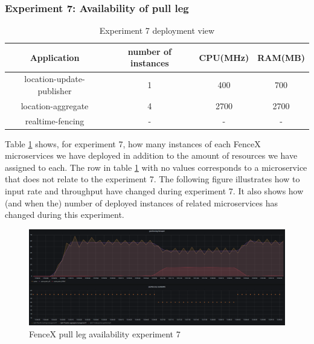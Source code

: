 \documentclass[a4]{report}
\begin{document}
    \subsubsection{Experiment 7: Availability of pull leg}
    \begin{table}[h!]
        \centering
        \begin{tabular}{|c|c|c|c|}
            \hline
            Application               & number of instances & CPU(MHz) & RAM(MB) \\
            \hline
            location-update-publisher & 1                   & 400      & 700     \\
            location-aggregate        & 4                   & 2700     & 2700    \\
            realtime-fencing          & -                   & -        & -       \\
            \hline
        \end{tabular}
        \caption{Experiment 7 deployment view}
        \label{table:ex7-dv}
    \end{table}

    Table \ref{table:ex7-dv} shows, for experiment 7, how many instances of each FenceX microservices we have
    deployed in addition to the amount of resources we have assigned to each.
    The row in table \ref{table:ex7-dv} with no values corresponds to a microservice that does not relate to the
    experiment 7.
    The following figure illustrates how to input rate and throughput have changed during experiment 7.
    It also shows how (and when the) number of deployed instances of related microservices has changed during this
    experiment.

    \begin{figure}
        \caption{FenceX pull leg availability experiment 7}
        \label{fig:ex7}
        \includegraphics[scale=0.5]{images/evaluation/ex7-benchmarking-ongoing-2per10sec.png}
    \end{figure}
\end{document}
